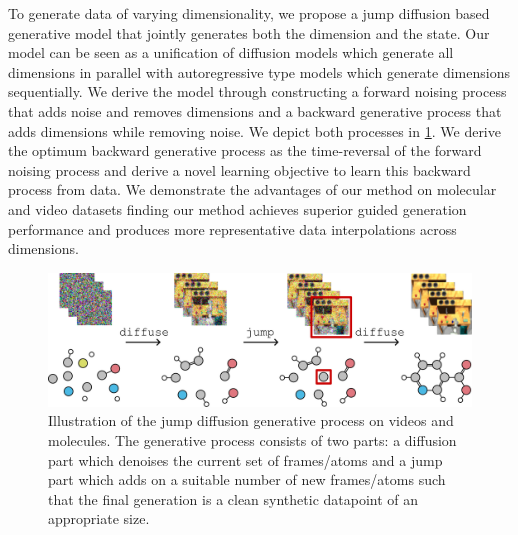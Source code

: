 To generate data of varying dimensionality, we propose a jump diffusion based generative model that jointly generates both the dimension and the state. Our model can be seen as a unification of diffusion models which generate all dimensions in parallel with autoregressive type models which generate dimensions sequentially. We derive the model through constructing a forward noising process that adds noise and removes dimensions and a backward generative process that adds dimensions while removing noise. We depict both processes in \cref{fig:tddm-fig1}. We derive the optimum backward generative process as the time-reversal of the forward noising process and derive a novel learning objective to learn this backward process from data. We demonstrate the advantages of our method on molecular and video datasets finding our method achieves superior guided generation performance and produces more representative data interpolations across dimensions.

\begin{figure}
    \centering
    \includegraphics[width=\textwidth]{figs/tddm/fig1.pdf}
    \caption{Illustration of the jump diffusion generative process on videos and molecules. The generative process consists of two parts: a diffusion part which denoises the current set of frames/atoms and a jump part which adds on a suitable number of new frames/atoms such that the final generation is a clean synthetic datapoint of an appropriate size.
    }
    \label{fig:tddm-fig1}
\end{figure}


